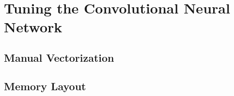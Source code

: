 
\section{Tuning the Convolutional Neural Network}
\label{sec-tuning}

\subsection{Manual Vectorization}
\label{sec-tuning-vectorization}

%

\subsection{Memory Layout}
\label{sec-tuning-memory}


